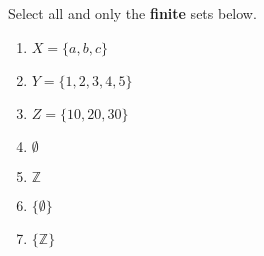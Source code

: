 
Select all and only the {\bf finite} sets below.

\begin{enumerate}
\item $X = \{ a,b,c\}$
\item $Y = \{ 1, 2, 3, 4, 5\}$
\item $Z = \{ 10, 20, 30 \}$
\item $\emptyset$
\item $\mathbb{Z}$
\item $\{ \emptyset \}$
\item $\{ \mathbb{Z} \}$
\end{enumerate}